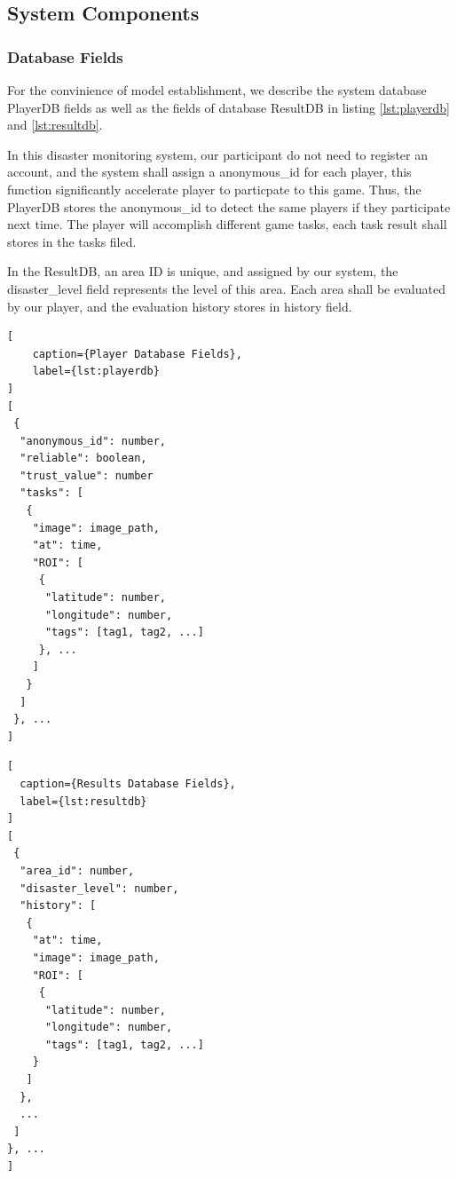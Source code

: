 \subsection{System Components}

\subsubsection{Database Fields}

  For the convinience of model establishment, we describe the system database PlayerDB 
  fields as well as the fields of database ResultDB in listing \ref{lst:playerdb}
  and \ref{lst:resultdb}.

  In this disaster monitoring system, our participant do not need to register an account,
  and the system shall assign a anonymous\_id for each player, this function significantly 
  accelerate player to particpate to this game. Thus, the PlayerDB stores the anonymous\_id
  to detect the same players if they participate next time. The player will accomplish different
  game tasks, each task result shall stores in the tasks filed.

  In the ResultDB, an area ID is unique, and assigned by our system, the disaster\_level field
  represents the level of this area. Each area shall be evaluated by our player, and the evaluation
  history stores in history field.


\noindent\begin{minipage}{.45\textwidth}
\begin{lstlisting}[
    caption={Player Database Fields},
    label={lst:playerdb}
]
[
 {
  "anonymous_id": number,
  "reliable": boolean,
  "trust_value": number
  "tasks": [
   {
    "image": image_path,
    "at": time, 
    "ROI": [
     {
      "latitude": number,
      "longitude": number,
      "tags": [tag1, tag2, ...]
     }, ...
    ]
   }
  ]
 }, ...
]
\end{lstlisting}
\end{minipage}\hfill
\begin{minipage}{.45\textwidth}
\begin{lstlisting}[
  caption={Results Database Fields},
  label={lst:resultdb}
]
[
 {
  "area_id": number,
  "disaster_level": number,
  "history": [
   {
    "at": time,
    "image": image_path,
    "ROI": [
     {
      "latitude": number,
      "longitude": number,
      "tags": [tag1, tag2, ...]
    }
   ]
  }, 
  ...
 ]
}, ...
]
\end{lstlisting}
\end{minipage}


